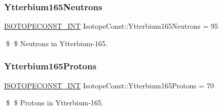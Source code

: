 \subsubsection{\texorpdfstring{Ytterbium165\+Neutrons}{Ytterbium165Neutrons}}
{\footnotesize\ttfamily \mbox{\hyperlink{group___isotope_const-_macros_ga5f18360b3e99483a35c32d789e62621c}{I\+S\+O\+T\+O\+P\+E\+C\+O\+N\+S\+T\+\_\+\+I\+NT}} Isotope\+Const\+::\+Ytterbium165\+Neutrons = 95}

\$ \$ Neutrons in Ytterbium-\/165. \mbox{\label{group___isotope_const-_ytterbium-_yb165_ga05592b7c21d440008d6ff393e2e9ac59}} 
\subsubsection{\texorpdfstring{Ytterbium165\+Protons}{Ytterbium165Protons}}
{\footnotesize\ttfamily \mbox{\hyperlink{group___isotope_const-_macros_ga5f18360b3e99483a35c32d789e62621c}{I\+S\+O\+T\+O\+P\+E\+C\+O\+N\+S\+T\+\_\+\+I\+NT}} Isotope\+Const\+::\+Ytterbium165\+Protons = 70}

\$ \$ Protons in Ytterbium-\/165. 